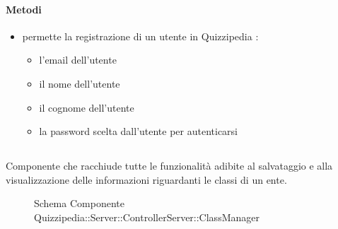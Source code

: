 \paragraph{Metodi}
\begin{itemize}
\item {}
\newline
permette la registrazione di un utente in Quizzipedia
\newline
{} :
\begin{itemize}
\item {}
\newline
l'email dell'utente
\item {}
\newline
il nome dell'utente
\item {}
\newline
il cognome dell'utente
\item {}
\newline
la password scelta dall'utente per autenticarsi
\end{itemize}
\end{itemize}
\subsection{}
Componente che racchiude tutte le funzionalità adibite al salvataggio e alla visualizzazione delle informazioni riguardanti le classi di un ente.
\begin{figure}[H]
\centering
\noindent{}
\caption[Schema Componente Quizzipedia::Server::ControllerServer::ClassManager]{Schema Componente Quizzipedia::Server::ControllerServer::ClassManager}
\end{figure}
